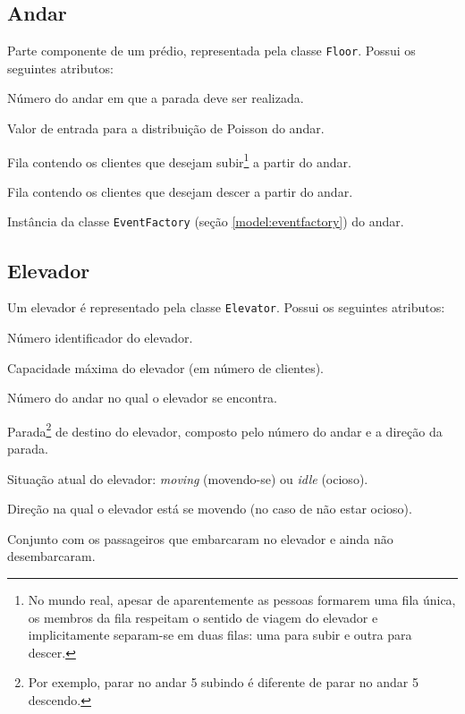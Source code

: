\subsection{Andar} \label{model:floor}

Parte componente de um prédio, representada pela classe \texttt{Floor}. Possui
os seguintes atributos:

  \begin{description}[leftmargin=!,labelwidth=\widthof{\bfseries eventFactory}]
    \item[\texttt{number}] Número do andar em que a parada deve ser realizada.
    \item[\texttt{lambda}] Valor de entrada para a distribuição de Poisson do andar.
    \item[\texttt{upLine}] Fila contendo os clientes que desejam subir\footnote{No mundo real, apesar de aparentemente as pessoas formarem
    uma fila única, os membros da fila respeitam o sentido de viagem do elevador
    e implicitamente separam-se em duas filas: uma para subir e outra para
    descer.} a partir do andar.
    \item[\texttt{downLine}] Fila contendo os clientes que desejam descer a partir do andar.
    \item[\texttt{eventFactory}] Instância da classe \texttt{EventFactory} (seção \ref{model:eventfactory}) do andar.
  \end{description}

\subsection{Elevador}

  Um elevador é representado pela classe \texttt{Elevator}. Possui os seguintes
  atributos:

  \begin{description}[leftmargin=!,labelwidth=\widthof{\bfseries arrivalFloor}]
    \item[\texttt{number}] Número identificador do elevador.
    \item[\texttt{capacity}] Capacidade máxima do elevador (em número de clientes).
    \item[\texttt{location}] Número do andar no qual o elevador se encontra.
    \item[\texttt{destination}] Parada\footnote{Por exemplo, parar no andar 5 subindo é diferente de parar no andar 5 descendo.} de destino do elevador, composto pelo número do andar e a direção da parada.
    \item[\texttt{status}] Situação atual do elevador: \textit{moving} (movendo-se) ou \textit{idle} (ocioso).
    \item[\texttt{direction}] Direção na qual o elevador está se movendo (no caso de não estar ocioso).
    \item[\texttt{passengers}] Conjunto com os passageiros que embarcaram no elevador e ainda não desembarcaram.
  \end{description}

